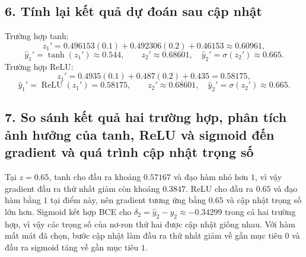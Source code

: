 \documentclass[12pt,a4paper]{article}
\begin{document}
\subsection*{6. Tính lại kết quả dự đoán sau cập nhật}

 Trường hợp tanh:
\[
z_1'=0.496153(0.1)+0.492306(0.2)+0.46153\approx0.60961,
\]
\[
\hat y_1'=\tanh(z_1')\approx0.544,\qquad
z_2'\approx0.68601,\quad \hat y_2'=\sigma(z_2')\approx0.665.
\]
Trường hợp ReLU:
\[
z_1'=0.4935(0.1)+0.487(0.2)+0.435=0.58175,
\]
\[
\hat y_1'=\operatorname{ReLU}(z_1')=0.58175,\qquad
z_2'\approx0.68601,\quad \hat y_2'=\sigma(z_2')\approx0.665.
\]

\subsection*{7. So sánh kết quả hai trường hợp, phân tích ảnh hưởng của tanh, ReLU và sigmoid đến gradient và quá trình cập nhật trọng số}

 Tại $z=0.65$, tanh cho đầu ra khoảng $0.57167$ và đạo hàm nhỏ hơn $1$, vì vậy gradient đầu ra thứ nhất giảm còn khoảng $0.3847$. ReLU cho đầu ra $0.65$ và đạo hàm bằng $1$ tại điểm này, nên gradient tương ứng bằng $0.65$ và cập nhật trọng số lớn hơn. Sigmoid kết hợp BCE cho $\delta_2=\hat y_2-y_2\approx-0.34299$ trong cả hai trường hợp, vì vậy các trọng số của nơ-ron thứ hai được cập nhật giống nhau. Với hàm mất mát đã chọn, bước cập nhật làm đầu ra thứ nhất giảm về gần mục tiêu $0$ và đầu ra sigmoid tăng về gần mục tiêu $1$.
\end{document}
